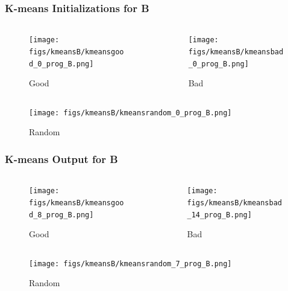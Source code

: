 \documentclass[11pt]{beamer}
\begin{document}
\begin{frame}
\frametitle{K-means Initializations for B}
\begin{columns}[onlytextwidth]
\begin{column}{.45\textwidth}
\begin{figure}
  \texttt{[image: figs/kmeansB/kmeansgood\_0\_prog\_B.png]}
  \caption{Good}
\end{figure}
\end{column}
\hfill
\begin{column}{.45\textwidth}
\begin{figure}
  \texttt{[image: figs/kmeansB/kmeansbad\_0\_prog\_B.png]}
  \caption{Bad}
\end{figure}
\end{column}
\end{columns}\vfill

\begin{figure}
  \texttt{[image: figs/kmeansB/kmeansrandom\_0\_prog\_B.png]}
  \caption{Random}
\end{figure}
\end{frame}


\begin{frame}
\frametitle{K-means Output for B}
\begin{columns}[onlytextwidth]
\begin{column}{.45\textwidth}
\begin{figure}
  \texttt{[image: figs/kmeansB/kmeansgood\_8\_prog\_B.png]}
  \caption{Good}
\end{figure}
\end{column}
\hfill
\begin{column}{.45\textwidth}
\begin{figure}
  \texttt{[image: figs/kmeansB/kmeansbad\_14\_prog\_B.png]}
  \caption{Bad}
\end{figure}
\end{column}
\end{columns}\vfill

\begin{figure}
  \texttt{[image: figs/kmeansB/kmeansrandom\_7\_prog\_B.png]}
  \caption{Random}
\end{figure}
\end{frame}
\end{document}
